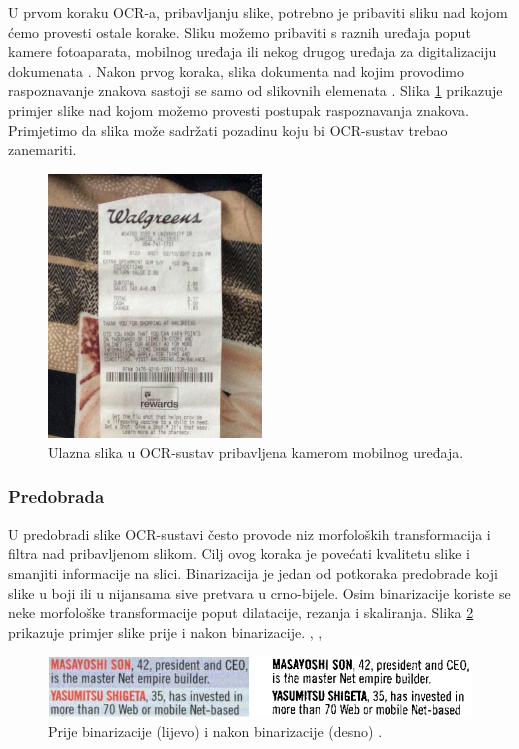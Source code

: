 \documentclass[times, utf8, zavrsni]{fer}
\begin{document}
U prvom koraku OCR-a, pribavljanju slike, potrebno je pribaviti sliku nad kojom ćemo
provesti ostale korake. Sliku možemo pribaviti s raznih uređaja poput kamere fotoaparata,
mobilnog uređaja ili nekog drugog uređaja za digitalizaciju dokumenata .
Nakon prvog koraka, slika dokumenta nad kojim provodimo raspoznavanje znakova sastoji se
samo od slikovnih elemenata  \citep{Vynckier:2018:HowOcrWorks}.
Slika \ref{fig:receipt-example-02} prikazuje primjer slike nad kojom možemo provesti
postupak raspoznavanja znakova. Primjetimo da slika može sadržati pozadinu koju bi
OCR-sustav trebao zanemariti.

\begin{figure}[htb]
    \centering
    \includegraphics[height=7cm]{images/receipt-example-02.jpeg}
    \caption{Ulazna slika u OCR-sustav pribavljena kamerom mobilnog uređaja.}
    \label{fig:receipt-example-02}
\end{figure}

\subsubsection{Predobrada}

U predobradi slike OCR-sustavi često provode niz morfoloških transformacija i filtra nad pribavljenom slikom.
Cilj ovog koraka je povećati kvalitetu slike i smanjiti informacije na slici. Binarizacija je jedan od
potkoraka predobrade koji slike u boji ili u nijansama sive pretvara u crno-bijele. Osim binarizacije
koriste se neke morfološke transformacije poput dilatacije, rezanja i skaliranja.
Slika \ref{fig:binarization} prikazuje primjer slike prije i nakon binarizacije. \citep{Gulan:2016:Bacherlor},
\citep{DBLP:journals/corr/abs-1710-05703}, \citep{Jurin:2017:Master}

\begin{figure}[htb]
    \centering
    \includegraphics[width=\textwidth]{images/binarization.png}
    \caption{Prije binarizacije (lijevo) i nakon binarizacije (desno) \citep{Vynckier:2018:HowOcrWorks}.}
    \label{fig:binarization}
\end{figure}
\end{document}
